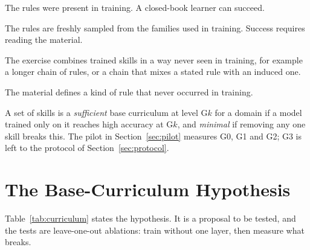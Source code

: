 \documentclass[11pt]{article}
\begin{document}
\begin{description}[leftmargin=1.5em,itemsep=2pt]
\item[G0: seen textbook, new exercise.] The rules were present in training. A closed-book learner can succeed.
\item[G1: new textbook.] The rules are freshly sampled from the families used in training. Success requires reading the material.
\item[G2: new combination of skills.] The exercise combines trained skills in a way never seen in training, for example a longer chain of rules, or a chain that mixes a stated rule with an induced one.
\item[G3: new family.] The material defines a kind of rule that never occurred in training.
\end{description}

A set of skills is a \emph{sufficient} base curriculum at level G$k$ for a domain if a model trained only on it reaches high accuracy at G$k$, and \emph{minimal} if removing any one skill breaks this.
The pilot in Section~\ref{sec:pilot} measures G0, G1 and G2; G3 is left to the protocol of Section~\ref{sec:protocol}.

\section{The Base-Curriculum Hypothesis}
\label{sec:curriculum}

Table~\ref{tab:curriculum} states the hypothesis.
It is a proposal to be tested, and the tests are leave-one-out ablations: train without one layer, then measure what breaks.
\end{document}
